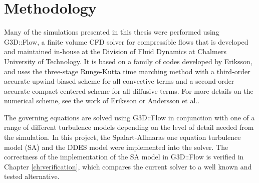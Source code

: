 



%
%
%
\chapter{Methodology\label{ch:NM}}
Many of the simulations presented in this thesis were performed using G3D::Flow, a finite volume CFD solver for compressible flows that is developed and maintained in-house at the Division of Fluid Dynamics at Chalmers University of Technology. It is based on a family of codes developed by Eriksson\cite{g3dflow}, and uses the three-stage Runge-Kutta time marching method with a third-order accurate upwind-biased scheme for all convective terms and a second-order accurate compact centered scheme for all diffusive terms. For more details on the numerical scheme, see the work of Eriksson\cite{g3dflow} or Andersson et al.\cite{g3dflowNA}.

The governing equations are solved using G3D::Flow in conjunction with one of a range of different turbulence models depending on the level of detail needed from the simulation. In this project, the Spalart-Allmaras one equation turbulence model (SA) and the DDES model were implemented into the solver. The correctness of the implementation of the SA model in G3D::Flow is verified in Chapter \ref{ch:verification}, which compares the current solver to a well known and tested alternative. 
%
